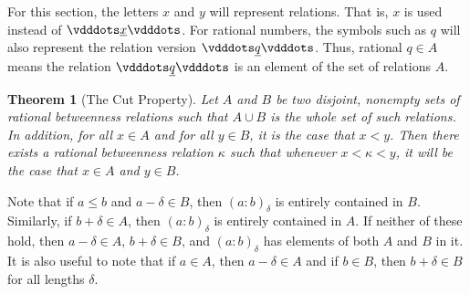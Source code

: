 \documentclass[12pt]{article}
\newtheorem{theorem}{Theorem}[section]
\begin{document}
For this section, the letters $x$ and $y$ will represent relations. That is, $x$ is used instead of $\xrel$. For rational numbers, the symbols such as $q$ will also represent the relation version $\xrel[q]$. Thus, rational $q \in A$ means the relation $\xrel[q]$ is an element of the set of relations $A$. 

\begin{theorem}[The Cut Property] 
Let $A$ and $B$ be two disjoint, nonempty sets of rational betweenness relations such that $A \cup B$ is the whole set of such relations. In addition, for all $x \in A$ and for all $y \in B$, it is the case that $x < y$. Then there exists a rational betweenness relation $\kappa$ such that whenever $x < \kappa < y$, it will be the case that $ x \in A$ and $y \in B$.
\end{theorem}

Note that if $a \leq b$ and $a-\delta \in B$, then $(a:b)_\delta$ is entirely contained in $B$. Similarly, if $b + \delta \in A$, then $(a:b)_\delta$ is entirely contained in $A$. If neither of these hold, then $a-\delta \in A$, $b+\delta \in B$, and $(a:b)_\delta$ has elements of both $A$ and $B$ in it. It is also useful to note that if $a \in A$, then $a-\delta \in A$ and if $b \in B$, then $b+\delta \in B$ for all lengths $\delta$.
\end{document}
